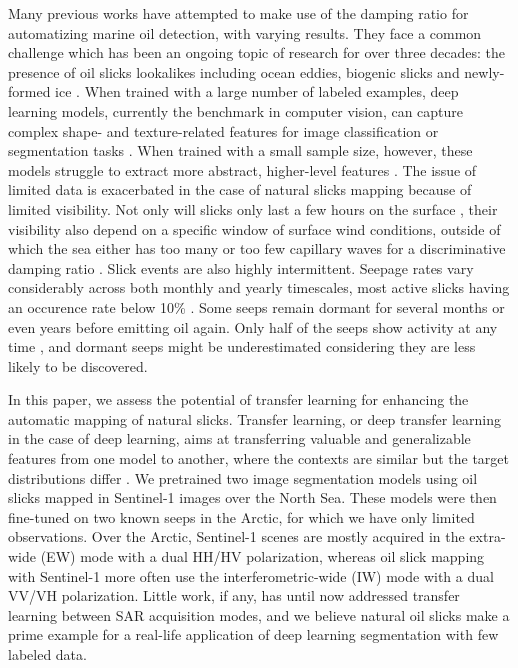 \documentclass[journal]{IEEEtran}
\begin{document}
Many previous works have attempted to make use of the damping ratio for automatizing marine oil detection, with varying results. They face a common challenge which has been an ongoing topic of research for over 
three decades: the presence of oil slicks lookalikes including ocean eddies, biogenic slicks and newly-formed ice \cite{johanssonCanMineralOil2020,hovlandSlickDetectionSAR1994,alpersOilsSurfactants2004,alpersOilSpillDetection2017,espedalSatelliteDetectionNatural1996}. 
When trained with a large number of labeled examples, deep learning models, currently the benchmark in computer vision, can capture complex shape- and texture-related features for image classification or 
segmentation tasks \cite{goodfellowDeepLearning2016}. When trained with a small sample size, however, these models struggle to extract more abstract, higher-level features
\cite{bengioDeepLearnersBenefit2011,bengioDeepLearningRepresentations2012}. The issue of limited data is exacerbated in the case of natural slicks mapping because of limited visibility. 
Not only will slicks only last a few hours on the surface \cite{jatiaultMonitoringNaturalOil2017,daneshgaraslHindcastModelingOil2017,oreillyDistributionMagnitudeVariability2022}, 
their visibility also depend on a specific window of surface wind conditions, outside of which the sea either has too many or too few capillary waves for a discriminative 
damping ratio \cite{quigleyInvestigationDampingRatio2023,sausDetectionDelineationProduced2021,gadeImagingBiogenicAnthropogenic1998}. 
\IEEEpubidadjcol  
Slick events are also highly intermittent. Seepage rates vary considerably across both monthly and yearly timescales, most active slicks having an occurence rate below 10\% 
\cite{jatiaultNaturalOilSeep2024,oreillyDistributionMagnitudeVariability2022}. Some seeps remain dormant for several months or even years before emitting oil again. Only half of the seeps show activity at any time 
\cite{jatiaultMonitoringNaturalOil2017,garcia-pinedaRemotesensingEvaluationGeophysical2010}, and dormant seeps might be underestimated considering they are less likely to be discovered.

In this paper, we assess the potential of transfer learning for enhancing the automatic mapping of natural slicks. Transfer learning, or deep transfer learning in the case of deep learning, aims at 
transferring valuable and generalizable features from one model to another, where the contexts are similar but the target distributions differ \cite{goodfellowDeepLearning2016}. 
We pretrained two image segmentation models using oil slicks mapped in Sentinel-1 images over the North Sea. These models were then fine-tuned on two known seeps in the Arctic, for which we have only 
limited observations. Over the Arctic, Sentinel-1 scenes are mostly acquired in the extra-wide (EW) mode with a dual HH/HV polarization, whereas oil slick mapping with Sentinel-1 more often use the 
interferometric-wide (IW) mode with a dual VV/VH polarization. Little work, if any, has until now addressed transfer learning between SAR acquisition modes, and we believe natural oil slicks make a 
prime example for a real-life application of deep learning segmentation with few labeled data. 
\end{document}
